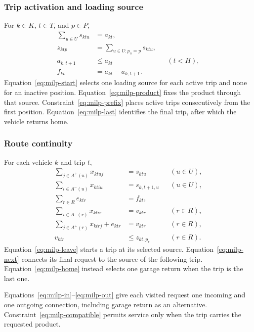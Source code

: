 \subsubsection{Trip activation and loading source}
For $k\in K$, $t\in T$, and $p\in P$,
\begin{align}
\sum_{u\in U}s_{ktu}&=a_{kt},\label{eq:milp-start}\\
z_{ktp}&=\sum_{u\in U:p_u=p}s_{ktu},\label{eq:milp-product}\\
a_{k,t+1}&\leq a_{kt} &&(t<H),\label{eq:milp-prefix}\\
f_{kt}&=a_{kt}-a_{k,t+1}.\label{eq:milp-last}
\end{align}
Equation~\eqref{eq:milp-start} selects one loading source for each active trip
and none for an inactive position. Equation~\eqref{eq:milp-product} fixes the
product through that source. Constraint~\eqref{eq:milp-prefix} places active
trips consecutively from the first position. Equation~\eqref{eq:milp-last}
identifies the final trip, after which the vehicle returns home.

\subsubsection{Route continuity}
For each vehicle $k$ and trip $t$,
\begin{align}
\sum_{j\in A^+(u)}x_{ktuj}&=s_{ktu} &&(u\in U),\label{eq:milp-leave}\\
\sum_{i\in A^-(u)}x_{ktiu}&=s_{k,t+1,u} &&(u\in U),\label{eq:milp-next}\\
\sum_{r\in R}e_{ktr}&=f_{kt},\label{eq:milp-home}\\
\sum_{i\in A^-(r)}x_{ktir}&=v_{ktr} &&(r\in R),\label{eq:milp-in}\\
\sum_{j\in A^+(r)}x_{ktrj}+e_{ktr}&=v_{ktr} &&(r\in R),\label{eq:milp-out}\\
v_{ktr}&\leq z_{kt,p_r} &&(r\in R).\label{eq:milp-compatible}
\end{align}
Equation~\eqref{eq:milp-leave} starts a trip at its selected source.
Equation~\eqref{eq:milp-next} connects its final request to the source of the
following trip. Equation~\eqref{eq:milp-home} instead selects one garage return
when the trip is the last one.

Equations~\eqref{eq:milp-in}--\eqref{eq:milp-out} give each visited request
one incoming and one outgoing connection, including garage return as an
alternative. Constraint~\eqref{eq:milp-compatible} permits service only when
the trip carries the requested product.

